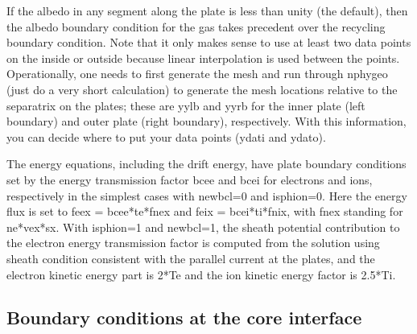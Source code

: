 \documentclass [12pt]{article}
\begin{document}
If the albedo in any segment along the plate is less than unity (the default),
then the albedo boundary condition for the gas takes precedent over the
recycling boundary condition. Note that it only makes sense to use at least
two data points on the inside or outside because linear interpolation is used
between the points. Operationally, one needs to first generate the mesh and
run through nphygeo (just do a very short calculation) to generate the mesh
locations relative to the separatrix on the plates; these are yylb and yyrb
for the inner plate (left boundary) and outer plate (right boundary), 
respectively. With this information, you can decide where to put your data
points (ydati and ydato).

The energy equations, including the drift energy, have plate boundary conditions
set by the energy transmission factor bcee and bcei for electrons and ions, 
respectively in the simplest cases with newbcl=0 and isphion=0.  Here the energy
flux is set to feex = bcee*te*fnex and feix = bcei*ti*fnix, with fnex standing
for ne*vex*sx.  With isphion=1 and newbcl=1, the sheath potential contribution
to the electron energy transmission factor is computed from the solution using
sheath condition consistent with the parallel current at the plates, and the
electron kinetic energy part is 2*Te and the ion kinetic energy factor is 2.5*Ti.


\subsection{Boundary conditions at the core interface}
\end{document}
